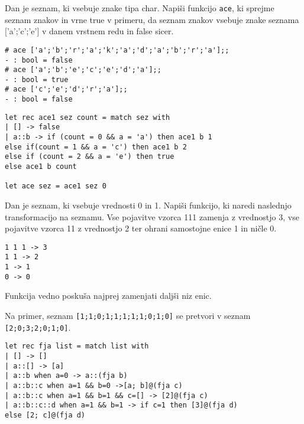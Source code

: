 \begin{ex}
Dan je seznam, ki vsebuje znake tipa char. Napi\v si funkcijo \lstinline{ace}, ki sprejme seznam znakov in vrne true v primeru, da seznam znakov vsebuje znake seznama ['a';'c';'e'] v danem vrstnem redu in false sicer. 

\begin{lstlisting}
# ace ['a';'b';'r';'a';'k';'a';'d';'a';'b';'r';'a'];;
- : bool = false
# ace ['a';'b';'e';'c';'e';'d';'a'];;
- : bool = true
# ace ['c';'e';'d';'r';'a'];;
- : bool = false
\end{lstlisting}

\begin{sol}
\begin{lstlisting}
let rec ace1 sez count = match sez with
| [] -> false
| a::b -> if (count = 0 && a = 'a') then ace1 b 1
else if(count = 1 && a = 'c') then ace1 b 2
else if (count = 2 && a = 'e') then true
else ace1 b count

let ace sez = ace1 sez 0
\end{lstlisting}
\end{sol}

\end{ex}
\begin{ex}
Dan je seznam, ki vsebuje vrednosti 0 in 1. Napi\v si funkcijo, ki naredi naslednjo transformacijo na seznamu. Vse pojavitve vzorca 111 zamenja z vrednostjo 3, vse pojavitve vzorca 11 z vrednostjo 2 ter ohrani samostojne enice 1 in ni\v cle 0. 
\begin{lstlisting}
1 1 1 -> 3
1 1 -> 2
1 -> 1
0 -> 0
\end{lstlisting}

Funkcija vedno posku\v sa najprej zamenjati dalj\v si niz enic.

Na primer, seznam \lstinline{[1;1;0;1;1;1;1;1;0;1;0]} se pretvori v seznam \lstinline{[2;0;3;2;0;1;0]}.

\begin{sol}
\begin{lstlisting}
let rec fja list = match list with
| [] -> []
| a::[] -> [a]
| a::b when a=0 -> a::(fja b)
| a::b::c when a=1 && b=0 ->[a; b]@(fja c)
| a::b::c when a=1 && b=1 && c=[] -> [2]@(fja c)
| a::b::c::d when a=1 && b=1 -> if c=1 then [3]@(fja d)
else [2; c]@(fja d)
\end{lstlisting}
\end{sol}



\end{ex}
